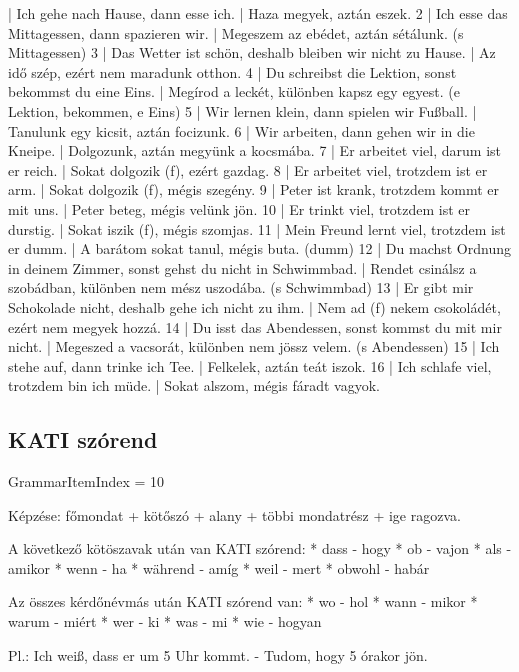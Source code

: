 \documentclass{article}
\newenvironment{desc}{\verbatim}{\endverbatim}
\newenvironment{exmp}{\verbatim}{\endverbatim}
\begin{document}
\begin{exmp}
1 | Ich gehe nach Hause, dann esse ich. | Haza megyek, aztán eszek.
2 | Ich esse das Mittagessen, dann spazieren wir. | Megeszem az ebédet, aztán sétálunk. (s Mittagessen)
3 | Das Wetter ist schön, deshalb bleiben wir nicht zu Hause. | Az idő szép, ezért nem maradunk otthon.
4 | Du schreibst die Lektion, sonst bekommst du eine Eins. | Megírod a leckét, különben kapsz egy egyest. (e Lektion, bekommen, e Eins)
5 | Wir lernen klein, dann spielen wir Fußball. | Tanulunk egy kicsit, aztán focizunk.
6 | Wir arbeiten, dann gehen wir in die Kneipe. | Dolgozunk, aztán megyünk a kocsmába.
7 | Er arbeitet viel, darum ist er reich. | Sokat dolgozik (f), ezért gazdag.
8 | Er arbeitet viel, trotzdem ist er arm. | Sokat dolgozik (f), mégis szegény.
9 | Peter ist krank, trotzdem kommt er mit uns. | Peter beteg, mégis velünk jön.
10 | Er trinkt viel, trotzdem ist er durstig. | Sokat iszik (f), mégis szomjas.
11 | Mein Freund lernt viel, trotzdem ist er dumm. | A barátom sokat tanul, mégis buta. (dumm)
12 | Du machst Ordnung in deinem Zimmer, sonst gehst du nicht in Schwimmbad. | Rendet csinálsz a szobádban, különben nem mész uszodába. (s Schwimmbad)
13 | Er gibt mir Schokolade nicht, deshalb gehe ich nicht zu ihm. | Nem ad (f) nekem csokoládét, ezért nem megyek hozzá.
14 | Du isst das Abendessen, sonst kommst du mit mir nicht. | Megeszed a vacsorát, különben nem jössz velem. (s Abendessen)
15 | Ich stehe auf, dann trinke ich Tee. | Felkelek, aztán teát iszok.
16 | Ich schlafe viel, trotzdem bin ich müde. | Sokat alszom, mégis fáradt vagyok.
\end{exmp}

\subsection{KATI szórend}

GrammarItemIndex = 10

\begin{desc}
Képzése:
főmondat + kötőszó + alany + többi mondatrész + ige ragozva.

A következő kötöszavak után van KATI szórend:
* dass - hogy
* ob - vajon
* als - amikor
* wenn - ha
* während - amíg
* weil - mert
* obwohl - habár

Az összes kérdőnévmás után KATI szórend van:
* wo - hol
* wann - mikor
* warum - miért
* wer - ki
* was - mi
* wie - hogyan

Pl.: Ich weiß, dass er um 5 Uhr kommt. - Tudom, hogy 5 órakor jön.
\end{desc}
\end{document}
